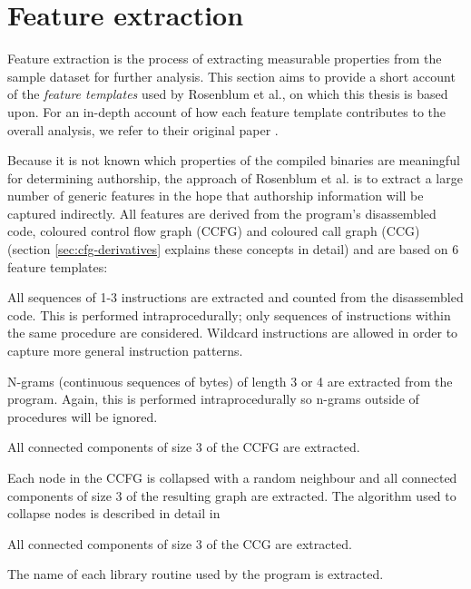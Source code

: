 \documentclass[a4paper,11pt]{kth-mag}
\begin{document}
\section{Feature extraction}
\label{sec:feature-extraction}
Feature extraction is the process of extracting measurable properties from the
sample dataset for further analysis. This section aims to provide a short
account of the \emph{feature templates} used by Rosenblum et al., on which this
thesis is based upon. For an in-depth account of how each feature template contributes
to the overall analysis, we refer to their original paper
\parencite{rosenblum2011wrote}.

Because it is not known which properties of the compiled binaries are
meaningful for determining authorship, the approach of Rosenblum et al. is to
extract a large number of generic features in the hope that authorship
information will be captured indirectly. All features are derived from the
program's disassembled code, coloured control flow graph (CCFG) and coloured
call graph (CCG) (section \ref{sec:cfg-derivatives} explains these concepts in
detail) and are based on 6 feature templates: 

\begin{description}[style=nextline]
\item[Idioms]
All sequences of 1-3 instructions are extracted and counted from the
disassembled code. This is performed intraprocedurally; only sequences of
instructions within the same procedure are considered. Wildcard instructions
are allowed in order to capture more general instruction patterns.

\item[N-grams]
N-grams (continuous sequences of bytes) of length 3 or 4 are extracted from
the program. Again, this is performed intraprocedurally so n-grams outside of
procedures will be ignored.

\item[Graphlets]
All connected components of size 3 of the CCFG are extracted.

\item[Supergraphlets]
Each node in the CCFG is collapsed with a random neighbour and all connected
components of size 3 of the resulting graph are extracted. The algorithm used
to collapse nodes is described in detail in \parencite{rosenblum2011recovering} 

\item[Call graphlets]
All connected components of size 3 of the CCG are extracted.

\item[External interaction]
The name of each library routine used by the program is extracted.
\end{description}
\end{document}
